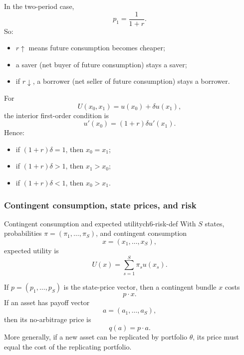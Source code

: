 \begin{keyformula}[title={Key Formula: interest-rate comparative statics}]
In the two-period case,
\[
p_1=\frac{1}{1+r}.
\]
So:
\begin{itemize}
    \item $r \uparrow$ means future consumption becomes cheaper;
    \item a saver (net buyer of future consumption) stays a saver;
    \item if $r \downarrow$, a borrower (net seller of future consumption) stays a borrower.
\end{itemize}
\end{keyformula}

\begin{keyformula}[title={Key Formula: discounted utility}]
For
\[
U(x_0,x_1)=u(x_0)+\delta u(x_1),
\]
the interior first-order condition is
\[
u'(x_0)=(1+r)\delta u'(x_1).
\]
Hence:
\begin{itemize}
    \item if $(1+r)\delta=1$, then $x_0=x_1$;
    \item if $(1+r)\delta>1$, then $x_1>x_0$;
    \item if $(1+r)\delta<1$, then $x_0>x_1$.
\end{itemize}
\end{keyformula}

\subsubsection{Contingent consumption, state prices, and risk}

\begin{definition}{Contingent consumption and expected utility}{ch6-risk-def}
With $S$ states, probabilities $\pi=(\pi_1,\dots,\pi_S)$, and contingent consumption
\[
x=(x_1,\dots,x_S),
\]
expected utility is
\[
U(x)=\sum_{s=1}^S \pi_s u(x_s).
\]
\end{definition}

\begin{keyformula}[title={Key Formula: state prices and asset pricing}]
If $p=(p_1,\dots,p_S)$ is the state-price vector, then a contingent bundle $x$ costs
\[
p\cdot x.
\]
If an asset has payoff vector
\[
a=(a_1,\dots,a_S),
\]
then its no-arbitrage price is
\[
q(a)=p\cdot a.
\]
More generally, if a new asset can be replicated by portfolio $\theta$, its price must equal the cost of the replicating portfolio.
\end{keyformula}

